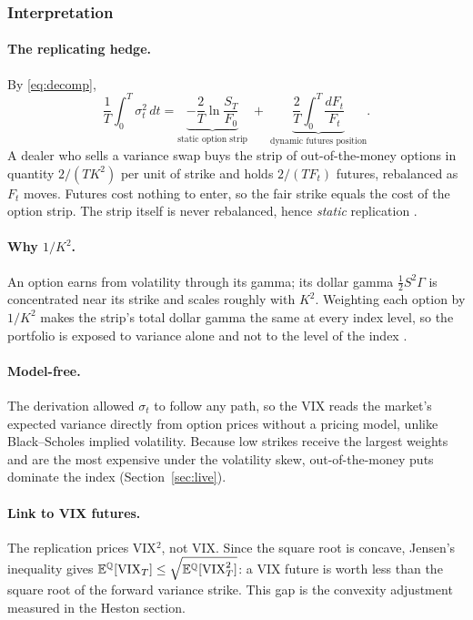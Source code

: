 \subsubsection{Interpretation}

\paragraph{The replicating hedge.} By \eqref{eq:decomp},
\begin{equation}
  \frac{1}{T}\int_0^T\sigma_t^2\,dt
  = \underbrace{-\frac{2}{T}\ln\frac{S_T}{F_0}}_{\text{static option strip}}
  \;+\; \underbrace{\frac{2}{T}\int_0^T\frac{dF_t}{F_t}}_{\text{dynamic futures position}} .
\end{equation}
A dealer who sells a variance swap buys the strip of out-of-the-money options in quantity $2/(TK^2)$ per unit of strike and holds $2/(TF_t)$ futures, rebalanced as $F_t$ moves. Futures cost nothing to enter, so the fair strike equals the cost of the option strip. The strip itself is never rebalanced, hence \emph{static} replication \cite{ddkz}.

\paragraph{Why $1/K^2$.} An option earns from volatility through its gamma; its dollar gamma $\tfrac{1}{2}S^2\Gamma$ is concentrated near its strike and scales roughly with $K^2$. Weighting each option by $1/K^2$ makes the strip's total dollar gamma the same at every index level, so the portfolio is exposed to variance alone and not to the level of the index \cite{ddkz}.

\paragraph{Model-free.} The derivation allowed $\sigma_t$ to follow any path, so the VIX reads the market's expected variance directly from option prices without a pricing model, unlike Black--Scholes implied volatility. Because low strikes receive the largest weights and are the most expensive under the volatility skew, out-of-the-money puts dominate the index (Section~\ref{sec:live}).

\paragraph{Link to VIX futures.} The replication prices VIX$^2$, not VIX. Since the square root is concave, Jensen's inequality gives $\mathbb{E}^{\mathbb{Q}}[\mathrm{VIX}_T]\le\sqrt{\mathbb{E}^{\mathbb{Q}}[\mathrm{VIX}_T^2]}$: a VIX future is worth less than the square root of the forward variance strike. This gap is the convexity adjustment measured in the Heston section.

